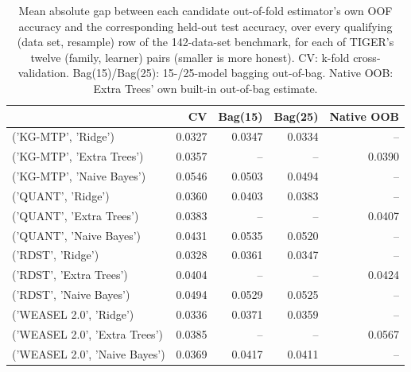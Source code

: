 \begin{table}[t]
\centering
\begin{tabular}{lrrrr}
\toprule
 & CV & Bag(15) & Bag(25) & Native OOB \\
\midrule
('KG-MTP', 'Ridge') & 0.0327 & 0.0347 & 0.0334 & -- \\
('KG-MTP', 'Extra Trees') & 0.0357 & -- & -- & 0.0390 \\
('KG-MTP', 'Naive Bayes') & 0.0546 & 0.0503 & 0.0494 & -- \\
('QUANT', 'Ridge') & 0.0360 & 0.0403 & 0.0383 & -- \\
('QUANT', 'Extra Trees') & 0.0383 & -- & -- & 0.0407 \\
('QUANT', 'Naive Bayes') & 0.0431 & 0.0535 & 0.0520 & -- \\
('RDST', 'Ridge') & 0.0328 & 0.0361 & 0.0347 & -- \\
('RDST', 'Extra Trees') & 0.0404 & -- & -- & 0.0424 \\
('RDST', 'Naive Bayes') & 0.0494 & 0.0529 & 0.0525 & -- \\
('WEASEL 2.0', 'Ridge') & 0.0336 & 0.0371 & 0.0359 & -- \\
('WEASEL 2.0', 'Extra Trees') & 0.0385 & -- & -- & 0.0567 \\
('WEASEL 2.0', 'Naive Bayes') & 0.0369 & 0.0417 & 0.0411 & -- \\
\bottomrule
\end{tabular}
\caption{Mean absolute gap between each candidate out-of-fold estimator's own OOF accuracy and the corresponding held-out test accuracy, over every qualifying (data set, resample) row of the 142-data-set benchmark, for each of TIGER's twelve (family, learner) pairs (smaller is more honest). CV: k-fold cross-validation. Bag(15)/Bag(25): 15-/25-model bagging out-of-bag. Native OOB: Extra Trees' own built-in out-of-bag estimate.}
\label{tab:oof-estimator-ablation}
\end{table}